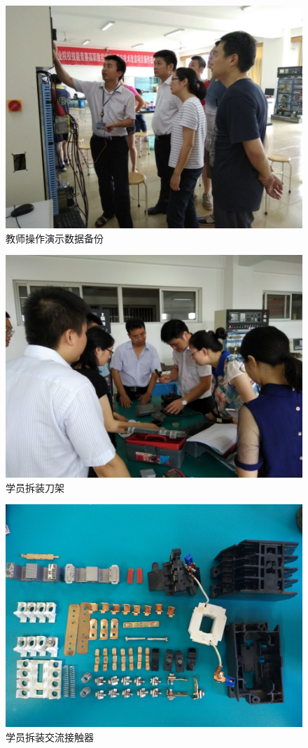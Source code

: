 \documentclass[12pt,a4paper]{ctexart}
\begin{document}
\begin{figure}[h]
	\begin{center}
		\includegraphics[width=0.8\linewidth]{image/3}
		\caption{教师操作演示数据备份}
	\end{center}
\end{figure}

\begin{figure}[h]
	\begin{center}
		\includegraphics[width=0.8\linewidth]{image/2}
		\caption{学员拆装刀架 }
	\end{center}
\end{figure}


\begin{figure}[h]
	\begin{center}
		\includegraphics[width=0.8\linewidth]{image/4}
		\caption{学员拆装交流接触器 }
	\end{center}
\end{figure}
\end{document}

